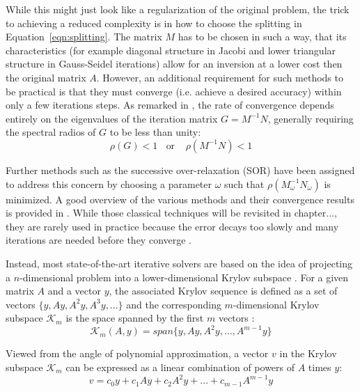 \noindent While this might just look like a regularization of the original problem, the trick to achieving a reduced complexity is in how to choose the splitting in Equation~\hyperref[eqn:splitting]{\ref{eqn:splitting}}. The matrix $M$ has to be chosen in such a way, that its characteristics (for example diagonal structure in Jacobi and lower triangular structure in Gauss-Seidel iterations) allow for an inversion at a lower cost then the original matrix $A$. However, an additional requirement for such methods to be practical is that they must converge (i.e. achieve a desired accuracy) within only a few iterations steps. As remarked in \cite{golub_matrix_2013}, the rate of convergence depends entirely on the eigenvalues of the iteration matrix $G=M^{-1}N$, generally requiring the spectral radios of $G$ to be less than unity:
\begin{equation}
    \rho(G) < 1 \;\;\text{ or }\;\;\ \rho(M^{-1}N)<1
\end{equation}

\noindent Further methods such as the successive over-relaxation (SOR) have been assigned to address this concern by choosing a parameter $\omega$ such that $\rho(M_\omega^{-1}N_\omega)$ is minimized. A good overview of the various methods and their convergence results is provided in \cite{saad_iterative_2003}. 
While those classical techniques will be revisited in chapter..., they are rarely used in practice because the error decays too slowly and many iterations are needed before they converge \cite{strang_introduction_2009}.

Instead, most state-of-the-art iterative solvers are based on the idea of projecting a $n$-dimensional problem into a lower-dimensional Krylov subspace \cite{golub_matrix_2013}. For a given matrix $A$ and a vector $y$, the associated Krylov sequence is defined as a set of vectors $\{y, Ay, A^2y, A^3y, \dots\}$ and the corresponding $m$-dimensional Krylov subspace $\mathcal{K}_m$ is the space spanned by the first $m$ vectors \cite{trefethen_numerical_1997}:
\begin{equation}
    \mathcal{K}_m(A,y) = span\{y, Ay, A^2y, \dots, A^{m-1}y\}
\end{equation}

\noindent Viewed from the angle of polynomial approximation, a vector $v$ in the Krylov subspace $\mathcal{K}_m$ can be expressed as a linear combination of powers of $A$ times $y$:
\begin{equation}
\label{eqn:poly1}
    v = c_0y+c_1Ay+c_2A^2y+\dots+c_{m-1}A^{m-1}y
\end{equation}

